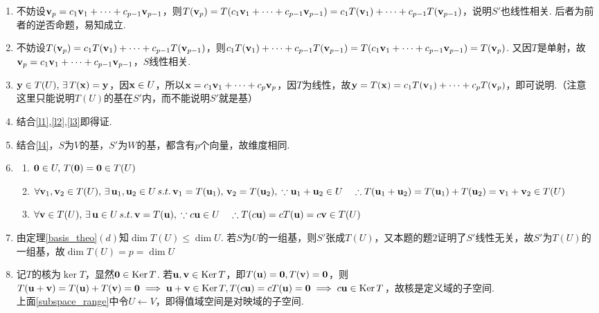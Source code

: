 \begin{analysis}
\begin{enumerate}
\itemsep-3pt
\item 不妨设$\mathbf{v}_p=c_1\mathbf{v}_1+\cdots+c_{p-1}\mathbf{v}_{p-1}$，则$T(\mathbf{v}_p)=T(c_1\mathbf{v}_1+\cdots+c_{p-1}\mathbf{v}_{p-1})=c_1T(\mathbf{v}_1)+\cdots+c_{p-1}T(\mathbf{v}_{p-1})$，说明$S'$也线性相关. 后者为前者的逆否命题，易知成立.
\item 不妨设$T(\mathbf{v}_p)=c_1T(\mathbf{v}_1)+\cdots+c_{p-1}T(\mathbf{v}_{p-1})$，则$c_1T(\mathbf{v}_1)+\cdots+c_{p-1}T(\mathbf{v}_{p-1})=T(c_1\mathbf{v}_1+\cdots+c_{p-1}\mathbf{v}_{p-1})=T(\mathbf{v}_p)$. 又因$T$是单射，故$\mathbf{v}_p=c_1\mathbf{v}_1+\cdots+c_{p-1}\mathbf{v}_{p-1}$，$S$线性相关.
\item $\mathbf{y}\in T(U),\,\exists\,T(\mathbf{x})=\mathbf{y}$，因$\mathbf{x}\in U$，所以$\mathbf{x}=c_1\mathbf{v}_1+\cdots+c_p\mathbf{v}_p$，因$T$为线性，故$\mathbf{y}=T(\mathbf{x})=c_1T(\mathbf{v}_1)+\cdots+c_pT(\mathbf{v}_p)$，即可说明.（注意这里只能说明$T(U)$的基在$S'$内，而不能说明$S'$就是基）
\item 结合\ref{l1},\ref{l2},\ref{l3}即得证.
\item 结合\ref{l4}，$S$为$V$的基，$S'$为$W$的基，都含有$p$个向量，故维度相同.
\item \begin{enumerate}
	\itemsep -3pt
	\item $\mathbf{0}\in U,\,T(\mathbf{0})=\mathbf{0}\in T(U)$
	\item $\forall\mathbf{v}_1,\mathbf{v}_2\in T(U),\,\exists\,\mathbf{u}_1,\mathbf{u}_2\in U\,s.t.\,\mathbf{v}_1=T(\mathbf{u}_1),\,\mathbf{v}_2=T(\mathbf{u}_2),\\
	\because \mathbf{u}_1+\mathbf{u}_2\in U\quad\therefore T(\mathbf{u}_1+\mathbf{u}_2)=T(\mathbf{u}_1)+T(\mathbf{u}_2)=\mathbf{v}_1+\mathbf{v}_2 \in T(U)$
	\item $\forall\mathbf{v}\in T(U),\,\exists\,\mathbf{u}\in U\,s.t.\,\mathbf{v}=T(\mathbf{u}),\\
	\because c\mathbf{u}\in U\quad\therefore T(c\mathbf{u})=cT(\mathbf{u})=c\mathbf{v}\in T(U)$
\end{enumerate}
\item 由定理\ref{basis_theo}$(d)$知$\dim T(U)\leq\dim U$. 若$S$为$U$的一组基，则$S'$张成$T(U)$，又本题的题$2$证明了$S'$线性无关，故$S'$为$T(U)$的一组基，故$\dim T(U)=p=\dim U$
\item 记$T$的核为$\ker T$，显然$\mathbf{0}\in\mathrm{Ker}\, T$. 若$\mathbf{u},\mathbf{v}\in \mathrm{Ker}\, T$，即$T(\mathbf{u})=\mathbf{0},T(\mathbf{v})=\mathbf{0}$，则$T(\mathbf{u}+\mathbf{v})=T(\mathbf{u})+T(\mathbf{v})=\mathbf{0}\implies \mathbf{u}+\mathbf{v}\in \mathrm{Ker}\, T,T(c\mathbf{u})=cT(\mathbf{u})=\mathbf{0}\implies c\mathbf{u}\in\mathrm{Ker}\, T$，故核是定义域的子空间.\\
上面\ref{subspace_range}中令$U\gets V$，即得值域空间是对映域的子空间.
\end{enumerate}
\end{analysis}

